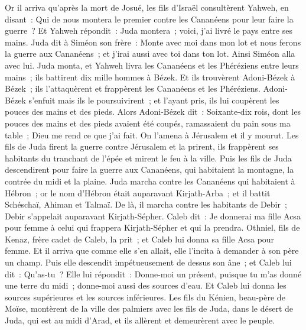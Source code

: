 \begin{multicols}{2}
\VerseOne{}Or il arriva qu'après la mort de Josué, les fils d'Israël consultèrent Yahweh, en disant~: Qui de nous montera le premier contre les Cananéens pour leur faire la guerre~?
Et Yahweh répondit~: Juda montera~; voici, j'ai livré le pays entre ses mains.
Juda dit à Siméon son frère~: Monte avec moi dans mon lot et nous ferons la guerre aux Cananéens~; et j'irai aussi avec toi dans ton lot. Ainsi Siméon alla avec lui.
Juda monta, et Yahweh livra les Cananéens et les Phéréziens entre leurs mains~; ils battirent dix mille hommes à Bézek.
Et ils trouvèrent Adoni-Bézek à Bézek~; ils l'attaquèrent et frappèrent les Cananéens et les Phéréziens.
Adoni-Bézek s'enfuit mais ils le poursuivirent~; et l'ayant pris, ils lui coupèrent les pouces des mains et des pieds.
Alors Adoni-Bézek dit~: Soixante-dix rois, dont les pouces des mains et des pieds avaient été coupés, ramassaient du pain sous ma table~; Dieu me rend ce que j'ai fait. On l'amena à Jérusalem et il y mourut.
Les fils de Juda firent la guerre contre Jérusalem et la prirent, ils frappèrent ses habitants du tranchant de l'épée et mirent le feu à la ville.
Puis les fils de Juda descendirent pour faire la guerre aux Cananéens, qui habitaient la montagne, la contrée du midi et la plaine.
Juda marcha contre les Cananéens qui habitaient à Hébron~; or le nom d'Hébron était auparavant Kirjath-Arba~; et il battit Schéschaï, Ahiman et Talmaï.
De là, il marcha contre les habitants de Debir~; Debir s'appelait auparavant Kirjath-Sépher.
Caleb dit~: Je donnerai ma fille Acsa pour femme à celui qui frappera Kirjath-Sépher et qui la prendra.
Othniel, fils de Kenaz, frère cadet de Caleb, la prit~; et Caleb lui donna sa fille Acsa pour femme.
Et il arriva que comme elle s'en allait, elle l'incita à demander à son père un champ. Puis elle descendit impétueusement de dessus son âne~; et Caleb lui dit~: Qu'as-tu~?
Elle lui répondit~: Donne-moi un présent, puisque tu m'as donné une terre du midi~; donne-moi aussi des sources d'eau. Et Caleb lui donna les sources supérieures et les sources inférieures.
Les fils du Kénien, beau-père de Moïse, montèrent de la ville des palmiers avec les fils de Juda, dans le désert de Juda, qui est au midi d'Arad, et ils allèrent et demeurèrent avec le peuple.

\end{multicols}
